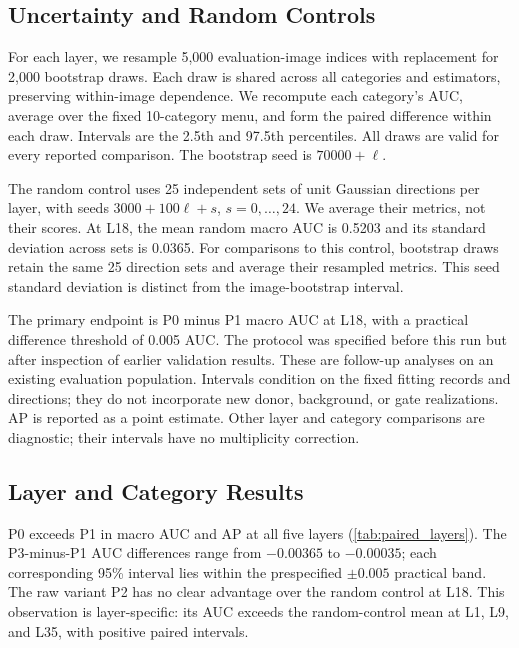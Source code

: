 \subsection{Uncertainty and Random Controls}

For each layer, we resample 5,000 evaluation-image indices with replacement
for 2,000 bootstrap draws. Each draw is shared across all categories and
estimators, preserving within-image dependence. We recompute each
category's AUC, average over the fixed 10-category menu, and form the
paired difference within each draw. Intervals are the 2.5th and 97.5th
percentiles. All draws are valid for every reported comparison. The
bootstrap seed is \(70000+\ell\).

The random control uses 25 independent sets of unit Gaussian directions
per layer, with seeds \(3000+100\ell+s\), \(s=0,\ldots,24\).
We average their metrics, not their scores. At L18, the mean random macro
AUC is 0.5203 and its standard deviation across sets is 0.0365.
For comparisons to this control, bootstrap draws retain the same 25
direction sets and average their resampled metrics. This seed standard
deviation is distinct from the image-bootstrap interval.

The primary endpoint is P0 minus P1 macro AUC at L18, with a practical
difference threshold of 0.005 AUC. The protocol was specified before this
run but after inspection of earlier validation results. These are
follow-up analyses on an existing evaluation population. Intervals
condition on the fixed fitting records and directions; they do not
incorporate new donor, background, or gate realizations. AP is reported
as a point estimate. Other layer and category comparisons are diagnostic;
their intervals have no multiplicity correction.




\subsection{Layer and Category Results}

P0 exceeds P1 in macro AUC and AP at all five layers
(\cref{tab:paired_layers}). The P3-minus-P1 AUC differences range from
\(-0.00365\) to \(-0.00035\); each corresponding 95\% interval
lies within the prespecified \(\pm0.005\) practical band. The raw
variant P2 has no clear advantage over the random control at L18. This
observation is layer-specific: its AUC exceeds the random-control mean
at L1, L9, and L35, with positive paired intervals.

